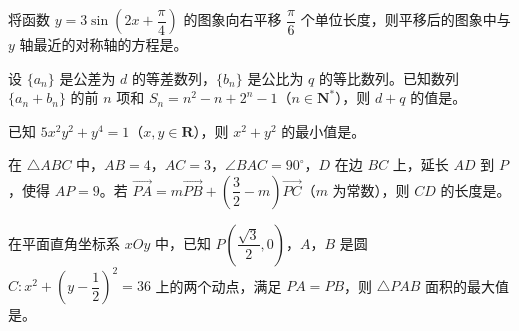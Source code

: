 \begin{question}
将函数 $y=3\sin\left(2x+\dfrac\pi4\right)$ 的图象向右平移 $\dfrac\pi6$ 个单位长度，则平移后的图象中与 $y$ 轴最近的对称轴的方程是\gkblank{}。

\end{question}
\begin{question}
设 $\{a_n\}$ 是公差为 $d$ 的等差数列，$\{b_n\}$ 是公比为 $q$ 的等比数列。已知数列 $\{a_n+b_n\}$ 的前 $n$ 项和 $S_n=n^2-n+2^n-1$（$n\in\mathbf N^*$），则 $d+q$ 的值是\gkblank{}。

\end{question}
\begin{question}
已知 $5x^2y^2+y^4=1$（$x,y\in\mathbf R$），则 $x^2+y^2$ 的最小值是\gkblank{}。

\Needspace{0.4\textheight}
\end{question}
\begin{question}
在 $\triangle ABC$ 中，$AB=4$，$AC=3$，$\angle BAC=90^\circ$，$D$ 在边 $BC$ 上，延长 $AD$ 到 $P$，使得 $AP=9$。若 $\overrightarrow{PA}=m\overrightarrow{PB}+\left(\dfrac32-m\right)\overrightarrow{PC}$（$m$ 为常数），则 $CD$ 的长度是\gkblank{}。
\nopagebreak[4]
\begin{center}\end{center}
\nopagebreak[4]
\end{question}
\begin{question}
在平面直角坐标系 $xOy$ 中，已知 $P\left(\dfrac{\sqrt3}2,0\right)$，$A$，$B$ 是圆 $C:x^2+\left(y-\dfrac12\right)^2=36$ 上的两个动点，满足 $PA=PB$，则 $\triangle PAB$ 面积的最大值是\gkblank{}。

\end{question}

